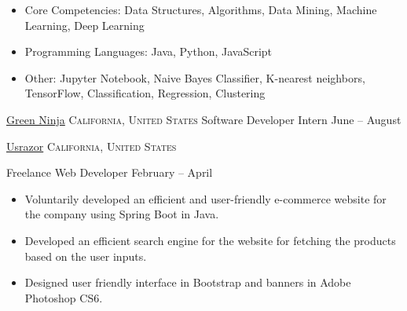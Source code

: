 \documentclass[10pt,a4paper]{article}
\begin{document}
{{{{{\begin{itemize}
    \end{itemize}}}
}


}

\spacedhrule{0.0em}{-0.4em}

 {
  \begin{itemize}
      \item {Core Competencies:}  Data Structures, Algorithms, Data Mining, Machine Learning, Deep Learning
      \item {Programming Languages:} Java, Python, JavaScript
      \item {Other:} Jupyter Notebook, Naive Bayes Classifier, K-nearest neighbors, TensorFlow, Classification, Regression, Clustering 
     
  \end{itemize}  
  }
  
\spacedhrule{0.0em}{-0.4em}
 







\headedsection  %
  {\href{http://www.greenninja.org/}{Green Ninja}}
  {\textsc{California, United States}} {%
  \headedsubsection
    {Software Developer Intern}
    {June  -- August }{
    }
}

\headedsection  %
  {\href{http://www.usrazor.com/}{Usrazor}}
  {\textsc{California, United States}} {%
  \headedsubsection
    {Freelance Web Developer}
    {February  -- April }
    {\bodytext
    {
    \begin{itemize}
        \item Voluntarily developed an efficient and user-friendly e-commerce website for the company using Spring Boot in Java.
        \item Developed an efficient search engine for the website for fetching the products based on the user inputs.
        \item Designed user friendly interface in Bootstrap and banners in Adobe Photoshop CS6.
       

\end{itemize}}}}}
\end{document}
